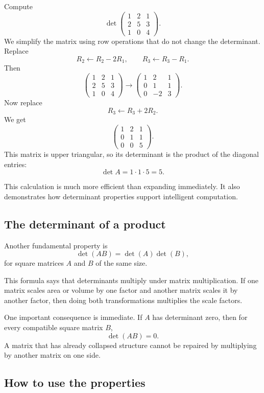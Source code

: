 \begin{examplebox}
Compute
\[
\det\begin{pmatrix}
1&2&1\\
2&5&3\\
1&0&4
\end{pmatrix}.
\]
We simplify the matrix using row operations that do not change the determinant. Replace
\[
R_2\leftarrow R_2-2R_1,
\qquad
R_3\leftarrow R_3-R_1.
\]
Then
\[
\begin{pmatrix}
1&2&1\\
2&5&3\\
1&0&4
\end{pmatrix}
\longrightarrow
\begin{pmatrix}
1&2&1\\
0&1&1\\
0&-2&3
\end{pmatrix}.
\]
Now replace
\[
R_3\leftarrow R_3+2R_2.
\]
We get
\[
\begin{pmatrix}
1&2&1\\
0&1&1\\
0&0&5
\end{pmatrix}.
\]
This matrix is upper triangular, so its determinant is the product of the diagonal entries:
\[
\det A=1\cdot1\cdot5=5.
\]
\end{examplebox}

This calculation is much more efficient than expanding immediately. It also demonstrates how determinant properties support intelligent computation.

\subsection{The determinant of a product}

Another fundamental property is
\[
\det(AB)=\det(A)\det(B),
\]
for square matrices \(A\) and \(B\) of the same size.

This formula says that determinants multiply under matrix multiplication. If one matrix scales area or volume by one factor and another matrix scales it by another factor, then doing both transformations multiplies the scale factors.

One important consequence is immediate. If \(A\) has determinant zero, then for every compatible square matrix \(B\),
\[
\det(AB)=0.
\]
A matrix that has already collapsed structure cannot be repaired by multiplying by another matrix on one side.

\subsection{How to use the properties}

